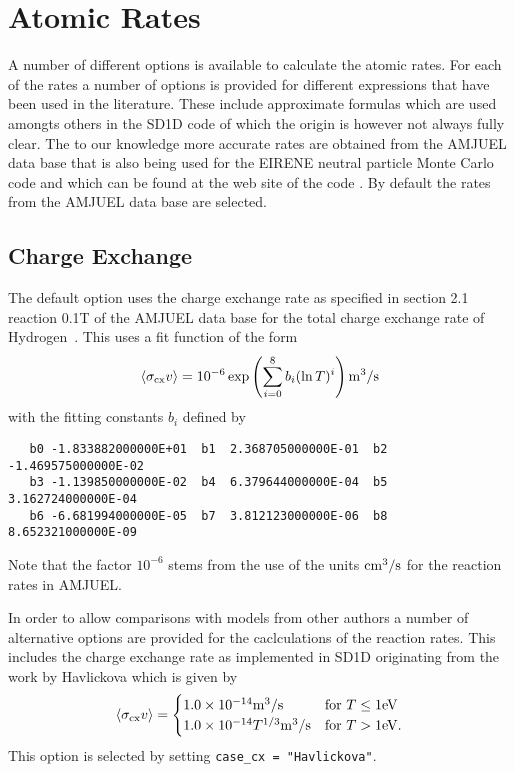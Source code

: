 \documentclass[amsmath,amssymb,a4]{revtex4}
\begin{document}
\section{Atomic Rates}\label{rates}

A number of different options is available to calculate the atomic rates. For each of the rates a number of options is provided for different expressions that have been used in the literature. These include approximate formulas which are used amongts others in the SD1D code \cite{SD1D} of which the origin is however not always fully clear. The to our knowledge more accurate rates are obtained from the AMJUEL data base that is also being used for the EIRENE neutral particle Monte Carlo code and which can be found at the web site of the code \cite{EIRENE}. By default the rates from the AMJUEL data base are selected.


\subsection{Charge Exchange}

The default option uses the charge exchange rate as specified in section 2.1 reaction 0.1T of the AMJUEL data base for the total charge exchange rate of Hydrogen~\cite{EIRENE}. This uses a fit function of the form
\begin{equation}\label{charge_exchange_AMJUEL}
    \langle\sigma_{\rm cx} v\rangle = 10^{-6} \exp\left( \sum_{i=0}^8 b_i (\ln T)^i \right)  {\rm m}^3/{\rm s}
\end{equation}
with the fitting constants $b_i$ defined by
\begin{small}\begin{verbatim}
   b0 -1.833882000000E+01  b1  2.368705000000E-01  b2 -1.469575000000E-02
   b3 -1.139850000000E-02  b4  6.379644000000E-04  b5  3.162724000000E-04
   b6 -6.681994000000E-05  b7  3.812123000000E-06  b8  8.652321000000E-09
\end{verbatim}\end{small}
Note that the factor $10^{-6}$ stems from the use of the units ${\rm cm}^3/{\rm s}$ for the reaction rates in AMJUEL.

In order to allow comparisons with models from other authors a number of alternative options are provided for the caclculations of the reaction rates. This includes the charge exchange rate as implemented in SD1D originating from the work by Havlickova \cite{havlickova2013} which is given by \cite{SD1D}
\begin{equation}\label{charge_exchange_SD1D}
    \langle\sigma_{\rm cx} v\rangle = \begin{cases} 1.0 \times 10^{-14} {\rm m}^3/{\rm s}             & \mbox{for } T \le 1 {\rm eV} \\
                                        1.0 \times 10^{-14} T^{1/3} {\rm m}^3/{\rm s} & \mbox{for } T >   1 {\rm eV}. \end{cases}
\end{equation}
This option is selected by setting {\tt case\_cx = "Havlickova"}.
\end{document}
